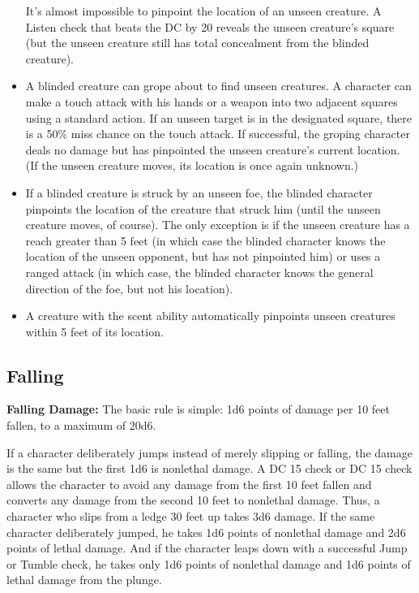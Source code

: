 \begin{itemize}
It's almost impossible to pinpoint the location of an unseen creature. A Listen 
check that beats the DC by 20 reveals the unseen creature's square (but the unseen 
creature still has total concealment from the blinded creature).
\item A blinded creature can grope about to find unseen creatures. A character can make 
a touch attack with his hands or a weapon into two adjacent squares using a standard 
action. If an unseen target is in the designated square, there is a 50\% miss chance 
on the touch attack. If successful, the groping character deals no damage but has 
pinpointed the unseen creature's current location. (If the unseen creature moves, 
its location is once again unknown.)
\item If a blinded creature is struck by an unseen foe, the blinded character pinpoints 
the location of the creature that struck him (until the unseen creature moves, 
of course). The only exception is if the unseen creature has a reach greater than 
5 feet (in which case the blinded character knows the location of the unseen opponent, 
but has not pinpointed him) or uses a ranged attack (in which case, the blinded 
character knows the general direction of the foe, but not his location).
\item A creature with the scent ability automatically pinpoints unseen creatures within 5 feet of its location.
\end{itemize}

\subsection{Falling}

\textbf{Falling Damage:} The basic rule is simple: 1d6 points of damage per 10 
feet fallen, to a maximum of 20d6.

If a character deliberately jumps instead of merely slipping or falling, the damage 
is the same but the first 1d6 is nonlethal damage. A DC 15  check or DC 15 
 check allows the character to avoid any damage from the first 10 feet fallen 
and converts any damage from the second 10 feet to nonlethal damage. Thus, a character 
who slips from a ledge 30 feet up takes 3d6 damage. If the same character deliberately 
jumped, he takes 1d6 points of nonlethal damage and 2d6 points of lethal damage. 
And if the character leaps down with a successful Jump or Tumble check, he takes 
only 1d6 points of nonlethal damage and 1d6 points of lethal damage from the plunge.

